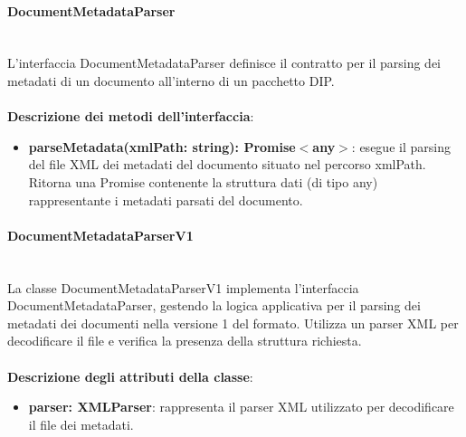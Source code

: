 \documentclass[a4paper,12pt]{article}
\begin{document}
{{{                \paragraph{DocumentMetadataParser}\label{par:DocumentMetadataParser}\mbox{}\\
                L'interfaccia DocumentMetadataParser definisce il contratto per il parsing dei metadati di un documento all'interno di un pacchetto DIP.\\
                \\
                \noindent \textbf{Descrizione dei metodi dell'interfaccia}:
                \begin{itemize}
                    \item \textbf{parseMetadata(xmlPath: string): Promise$<$any$>$}: esegue il parsing del file XML dei metadati del documento situato nel percorso xmlPath. Ritorna una Promise contenente la struttura dati (di tipo any) rappresentante i metadati parsati del documento.
                \end{itemize}
                \paragraph{DocumentMetadataParserV1}\label{par:DocumentMetadataParserV1}\mbox{}\\
                La classe DocumentMetadataParserV1 implementa l'interfaccia DocumentMetadataParser, gestendo la logica applicativa per il parsing dei metadati dei documenti nella versione 1 del formato. Utilizza un parser XML per decodificare il file e verifica la presenza della struttura richiesta.\\
                \\
                \textbf{Descrizione degli attributi della classe}:
                \begin{itemize}
                    \item \textbf{parser: XMLParser}: rappresenta il parser XML utilizzato per decodificare il file dei metadati.
                \end{itemize}
                
}}}
\end{document}
